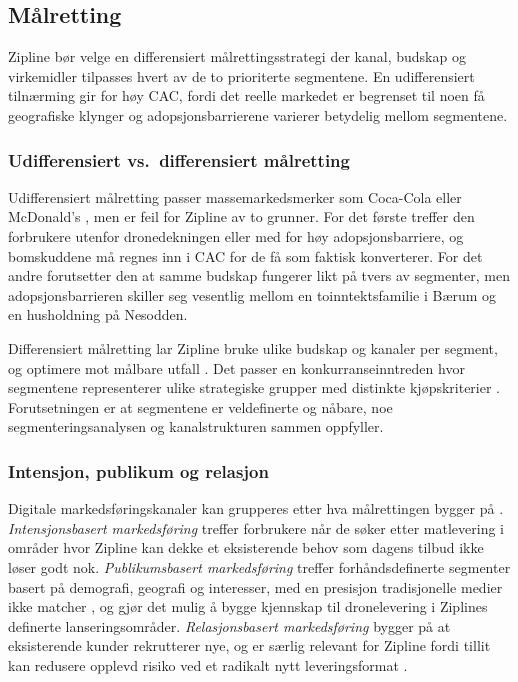 \subsection{Målretting}

Zipline bør velge en differensiert målrettingsstrategi der kanal,
budskap og virkemidler tilpasses hvert av de to prioriterte segmentene. En
udifferensiert tilnærming gir for høy CAC, fordi det reelle markedet er
begrenset til noen få geografiske klynger og adopsjonsbarrierene varierer
betydelig mellom segmentene.

\subsubsection{Udifferensiert vs.\ differensiert målretting}

Udifferensiert målretting passer massemarkedsmerker som Coca-Cola eller
McDonald's \parencite[Forelesning 4]{aspelund2026_forelesninger}, men er feil for Zipline av
to grunner. For det første treffer den forbrukere utenfor dronedekningen
eller med for høy adopsjonsbarriere, og bomskuddene må regnes inn i CAC for
de få som faktisk konverterer. 
For det andre forutsetter den at samme budskap fungerer likt på tvers av
segmenter, men adopsjonsbarrieren skiller seg vesentlig mellom en
toinntektsfamilie i Bærum og en husholdning på Nesodden.

Differensiert målretting lar Zipline bruke ulike budskap og kanaler per
segment, og optimere mot målbare utfall \parencite[Forelesning 4]{aspelund2026_forelesninger}.
Det passer en konkurranseinntreden hvor segmentene representerer ulike
strategiske grupper med distinkte kjøpskriterier
\parencite[jf.][]{oster1999}. Forutsetningen er at segmentene er
veldefinerte og nåbare, noe segmenteringsanalysen og kanalstrukturen sammen
oppfyller.

\subsubsection{Intensjon, publikum og relasjon}

Digitale markedsføringskanaler kan grupperes etter hva målrettingen bygger
på \parencite[Forelesning 4]{aspelund2026_forelesninger}. \textit{Intensjonsbasert
markedsføring} treffer forbrukere når de søker etter matlevering i områder
hvor Zipline kan dekke et eksisterende behov som dagens tilbud ikke løser
godt nok.
\textit{Publikumsbasert markedsføring} treffer forhåndsdefinerte segmenter
basert på demografi, geografi og interesser, med en presisjon tradisjonelle
medier ikke matcher \parencite{gallagher1997}, og gjør det mulig å bygge
kjennskap til dronelevering i Ziplines definerte lanseringsområder.
\textit{Relasjonsbasert markedsføring} bygger på at eksisterende kunder
rekrutterer nye, og er særlig relevant for Zipline fordi tillit kan redusere
opplevd risiko ved et radikalt nytt leveringsformat \parencite{rogers2003}.

